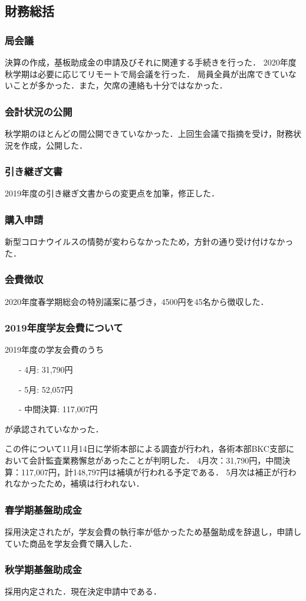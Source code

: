 \subsection*{財務総括}


\subsubsection*{局会議}
決算の作成，基板助成金の申請及びそれに関連する手続きを行った．
2020年度秋学期は必要に応じてリモートで局会議を行った．
局員全員が出席できていないことが多かった．また，欠席の連絡も十分ではなかった．


\subsubsection*{会計状況の公開}
秋学期のほとんどの間公開できていなかった．上回生会議で指摘を受け，財務状況を作成，公開した．


\subsubsection*{引き継ぎ文書}
2019年度の引き継ぎ文書からの変更点を加筆，修正した．


\subsubsection*{購入申請}
新型コロナウイルスの情勢が変わらなかったため，方針の通り受け付けなかった．


\subsubsection*{会費徴収}
2020年度春学期総会の特別議案に基づき，4500円を45名から徴収した．


\subsubsection*{2019年度学友会費について}
2019年度の学友会費のうち
\begin{itemize}
	\item[-] 4月: 31,790円
	\item[-] 5月: 52,057円
	\item[-] 中間決算: 117,007円
\end{itemize} 
が承認されていなかった．

この件について11月14日に学術本部による調査が行われ，各術本部BKC支部において会計監査業務懈怠があったことが判明した．
4月次：31,790円，中間決算：117,007円，計148,797円は補填が行われる予定である．
5月次は補正が行われなかったため，補填は行われない．


\subsubsection*{春学期基盤助成金}
採用決定されたが，学友会費の執行率が低かったため基盤助成を辞退し，申請していた商品を学友会費で購入した．


\subsubsection*{秋学期基盤助成金}
採用内定された．現在決定申請中である．
